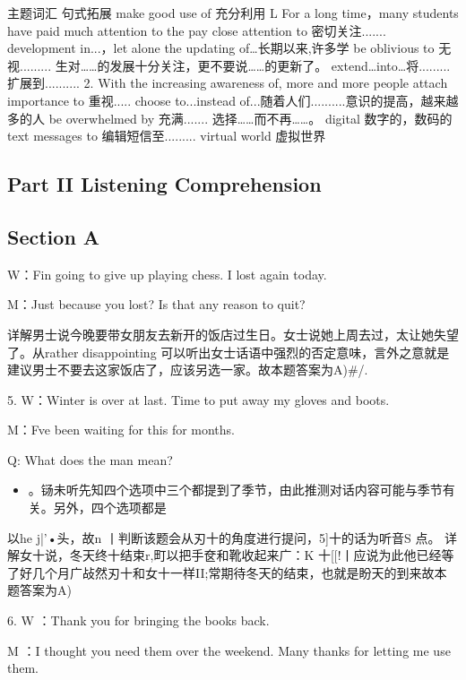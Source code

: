 \documentclass[UTF8,11pt]{ctexart}
\begin{document}
主题词汇 句式拓展 make good use of 充分利用 L For a long time，many students have paid much attention to the pay close attention to 密切关注....... development in...，let alone the updating of…长期以来,许多学 be oblivious to 无视......... 生对……的发展十分关注，更不要说……的更新了。 extend…into…将......... 扩展到.......... 2. With the increasing awareness of, more and more people attach importance to 重视..... choose to...instead of...随着人们..........意识的提高，越来越多的人 be overwhelmed by 充满....... 选择……而不再……。 digital 数字的，数码的 text messages to 编辑短信至......... virtual world 虚拟世界


\subsection*{Part II Listening Comprehension}


\subsection*{Section A}


W：Fin going to give up playing chess. I lost again today.


M：Just because you lost? Is that any reason to quit?


详解男士说今晚要带女朋友去新开的饭店过生日。女士说她上周去过，太让她失望了。从rather disappointing 可以听出女士话语中强烈的否定意味，言外之意就是建议男士不要去这家饭店了，应该另选一家。故本题答案为A)\#/.


5. W：Winter is over at last. Time to put away my gloves and boots.


M：Fve been waiting for this for months.


Q: What does the man mean?


\begin{itemize}[leftmargin=2em,itemsep=.2em,topsep=.4em]\item[A.] 。铴未听先知四个选项中三个都提到了季节，由此推测对话内容可能与季节有关。另外，四个选项都是
\end{itemize}

以he j|'•头，故n 丨判断该题会从刃十的角度进行提问，5]十的话为听音S 点。 详解女十说，冬天终十结束r,町以把手奁和靴收起来广：K 十[[!丨应说为此他已经等了好几个月广敁然刃十和女十一样II;常期待冬天的结束，也就是盼天的到来故本题答案为A)


6. W ：Thank you for bringing the books back.


M ：I thought you need them over the weekend. Many thanks for letting me use them.
\end{document}
